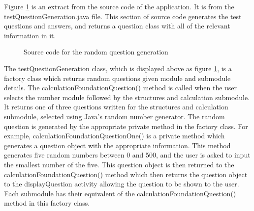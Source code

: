 \documentclass{article}
\begin{document}
Figure \ref{figure:testQuestionGeneration} is an extract from the source code of the application. It is from the testQuestionGeneration.java file. This section of source code generates the test questions and answers, and returns a question class with all of the relevant information in it. 

\begin{figure}[H]
	\centering
	\caption{Source code for the random question generation}
	\label{figure:testQuestionGeneration}
\end{figure}

The testQuestionGeneration class, which is displayed above as figure \ref{figure:testQuestionGeneration}, is a factory class which returns random questions given module and submodule details. The calculationFoundationQuestion() method is called when the user selects the number module followed by the structures and calculation submodule. It returns one of three questions written for the structures and calculation submodule, selected using Java's random number generator. The random question is generated by the appropriate private method in the factory class. For example, calculationFoundationQuestionOne() is a private method which generates a question object with the appropriate information. This method generates five random numbers between 0 and 500, and the user is asked to input the smallest number of the five. This question object is then returned to the calculationFoundationQuestion() method which then returns the question object to the displayQuestion activity allowing the question to be shown to the user. Each submodule has their equivalent of the calculationFoundationQuestion() method in this factory class. \par
\end{document}
